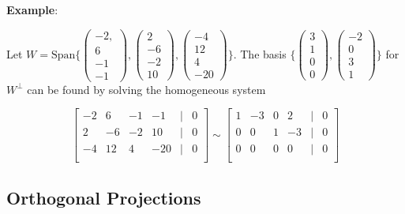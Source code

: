 \textbf{Example}:

Let $W = \text{Span} \Bigg\{ \begin{pmatrix}
    -2, \\ 6 \\ -1 \\ -1
\end{pmatrix}, \begin{pmatrix}
    2 \\ -6 \\ -2 \\ 10
\end{pmatrix}, \begin{pmatrix}
    -4 \\ 12 \\ 4 \\ -20
\end{pmatrix} \Bigg\}$. The basis $\Bigg\{ \begin{pmatrix}
    3 \\ 1 \\ 0 \\ 0
\end{pmatrix}, \begin{pmatrix}
    -2 \\ 0 \\ 3 \\ 1
\end{pmatrix} \Bigg\}$ for $W^\perp$ can be found by solving the homogeneous system

$$
\begin{bmatrix}
    -2 & 6 & -1 & -1 & | & 0 \\
    2 & -6 & -2 & 10 & | & 0 \\
    -4 & 12 & 4 & -20 & | & 0 \\
\end{bmatrix} \sim \begin{bmatrix}
    1 & -3 & 0 & 2 & | & 0 \\
    0 & 0 & 1 & -3 & | & 0 \\
    0 & 0 & 0 & 0 & | & 0 \\
\end{bmatrix}
$$

\subsection{Orthogonal Projections}


